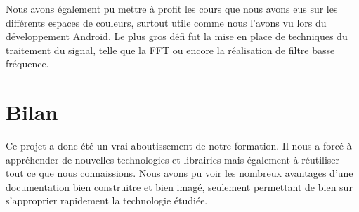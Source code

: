 Nous avons également pu mettre à profit les cours que nous avons eus sur les différents espaces de couleurs, surtout utile comme nous l'avons vu lors du développement Android. Le plus gros défi fut la mise
en place de techniques du traitement du signal, telle que la FFT ou encore la réalisation de filtre basse fréquence.

\section{Bilan}

Ce projet a donc été un vrai aboutissement de notre formation. Il nous a forcé à appréhender de nouvelles technologies et librairies mais également à réutiliser tout ce que nous connaissions. Nous avons pu voir
 les nombreux avantages d'une documentation bien construitre et bien imagé, seulement permettant de bien sur s'approprier rapidement la technologie étudiée.
